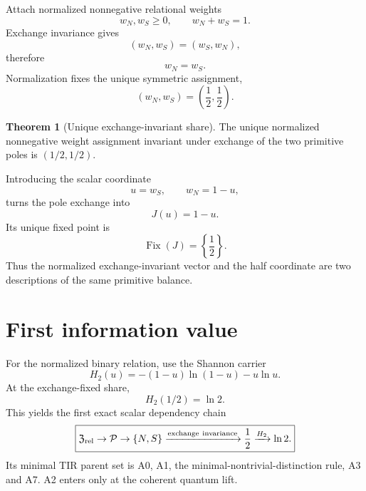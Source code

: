 \documentclass[11pt,a4paper,twoside]{book}
\theoremstyle{definition}
\newtheorem{theorem}{Theorem}[chapter]
\begin{document}
Attach normalized nonnegative relational weights
\begin{equation}
w_N,w_S\ge0,
\qquad
w_N+w_S=1.
\end{equation}
Exchange invariance gives
\begin{equation}
(w_N,w_S)=(w_S,w_N),
\end{equation}
therefore
\begin{equation}
w_N=w_S.
\end{equation}
Normalization fixes the unique symmetric assignment,
\begin{equation}
\boxed{
(w_N,w_S)=\left(\frac12,\frac12\right).
}
\label{eq:v12_unique_half_share}
\end{equation}

\begin{theorem}[Unique exchange-invariant share]
The unique normalized nonnegative weight assignment invariant under exchange of the two primitive poles is $(1/2,1/2)$.
\end{theorem}

Introducing the scalar coordinate
\[
u=w_S,
\qquad
w_N=1-u,
\]
turns the pole exchange into
\begin{equation}
J(u)=1-u.
\end{equation}
Its unique fixed point is
\begin{equation}
\boxed{\operatorname{Fix}(J)=\left\{\frac12\right\}.}
\label{eq:v12_half_fixed_point}
\end{equation}
Thus the normalized exchange-invariant vector and the half coordinate are two descriptions of the same primitive balance.

\section{First information value}

For the normalized binary relation, use the Shannon carrier
\begin{equation}
H_2(u)=-(1-u)\ln(1-u)-u\ln u.
\end{equation}
At the exchange-fixed share,
\begin{equation}
\boxed{H_2(1/2)=\ln2.}
\label{eq:v12_first_ln2}
\end{equation}
This yields the first exact scalar dependency chain
\begin{equation}
\boxed{
\mathfrak Z_{\rm rel}
\rightarrow
\mathcal P
\rightarrow
\{N,S\}
\xrightarrow{\rm exchange\ invariance}
\frac12
\xrightarrow{H_2}
\ln2.
}
\label{eq:v12_primitive_scalar_chain}
\end{equation}
Its minimal TIR parent set is A0, A1, the minimal-nontrivial-distinction rule, A3 and A7. A2 enters only at the coherent quantum lift.
\end{document}
